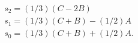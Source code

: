 \begin{equation}
\begin{array}{l}
    s_2=(1/3)(C-2B)\\
    s_1=(1/3)(C+B)-(1/2)A \\
    s_0=(1/3)(C+B)+(1/2)A.
  \end{array}
\end{equation}


